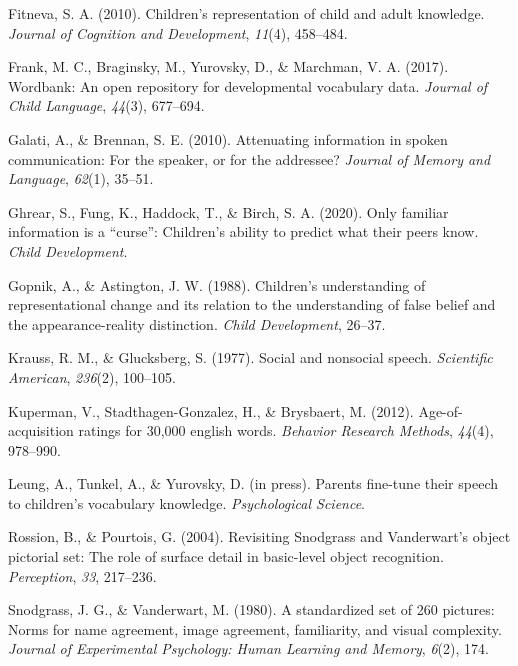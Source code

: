 \documentclass[10pt, letterpaper]{article}
\begin{document}
\leavevmode\hypertarget{ref-fitneva2010}{}%
Fitneva, S. A. (2010). Children's representation of child and adult
knowledge. \emph{Journal of Cognition and Development}, \emph{11}(4),
458--484.

\leavevmode\hypertarget{ref-frank2017}{}%
Frank, M. C., Braginsky, M., Yurovsky, D., \& Marchman, V. A. (2017).
Wordbank: An open repository for developmental vocabulary data.
\emph{Journal of Child Language}, \emph{44}(3), 677--694.

\leavevmode\hypertarget{ref-galati2010}{}%
Galati, A., \& Brennan, S. E. (2010). Attenuating information in spoken
communication: For the speaker, or for the addressee? \emph{Journal of
Memory and Language}, \emph{62}(1), 35--51.

\leavevmode\hypertarget{ref-ghrear2020}{}%
Ghrear, S., Fung, K., Haddock, T., \& Birch, S. A. (2020). Only familiar
information is a ``curse'': Children's ability to predict what their
peers know. \emph{Child Development}.

\leavevmode\hypertarget{ref-gopnik1988}{}%
Gopnik, A., \& Astington, J. W. (1988). Children's understanding of
representational change and its relation to the understanding of false
belief and the appearance-reality distinction. \emph{Child Development},
26--37.

\leavevmode\hypertarget{ref-krauss1977}{}%
Krauss, R. M., \& Glucksberg, S. (1977). Social and nonsocial speech.
\emph{Scientific American}, \emph{236}(2), 100--105.

\leavevmode\hypertarget{ref-kuperman2012}{}%
Kuperman, V., Stadthagen-Gonzalez, H., \& Brysbaert, M. (2012).
Age-of-acquisition ratings for 30,000 english words. \emph{Behavior
Research Methods}, \emph{44}(4), 978--990.

\leavevmode\hypertarget{ref-leung2021}{}%
Leung, A., Tunkel, A., \& Yurovsky, D. (in press). Parents fine-tune
their speech to children's vocabulary knowledge. \emph{Psychological
Science}.

\leavevmode\hypertarget{ref-rossion2004}{}%
Rossion, B., \& Pourtois, G. (2004). Revisiting Snodgrass and
Vanderwart's object pictorial set: The role of surface detail in
basic-level object recognition. \emph{Perception}, \emph{33}, 217--236.

\leavevmode\hypertarget{ref-snodgrass1980}{}%
Snodgrass, J. G., \& Vanderwart, M. (1980). A standardized set of 260
pictures: Norms for name agreement, image agreement, familiarity, and
visual complexity. \emph{Journal of Experimental Psychology: Human
Learning and Memory}, \emph{6}(2), 174.
\end{document}
